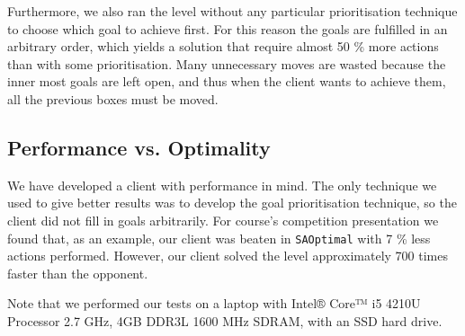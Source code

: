 Furthermore, we also ran the level without any particular prioritisation technique to choose which goal to achieve first.
For this reason the goals are fulfilled in an arbitrary order, which yields a solution that require almost 50 \% more actions than with some prioritisation.
Many unnecessary moves are wasted because the inner most goals are left open, and thus when the client wants to achieve them, all the previous boxes must be moved.

\subsection{Performance vs. Optimality}
\label{sec:performance vs. optimality}

We have developed a client with performance in mind.
The only technique we used to give better results was to develop the goal prioritisation technique, so the client did not fill in goals arbitrarily.
For course's competition presentation we found that, as an example, our client was beaten in \texttt{SAOptimal} with 7 \% less actions performed. 
However, our client solved the level approximately 700 times faster than the opponent.

Note that we performed our tests on a laptop with Intel® Core™ i5 4210U Processor 2.7 GHz, 4GB DDR3L 1600 MHz SDRAM, with an SSD hard drive.
